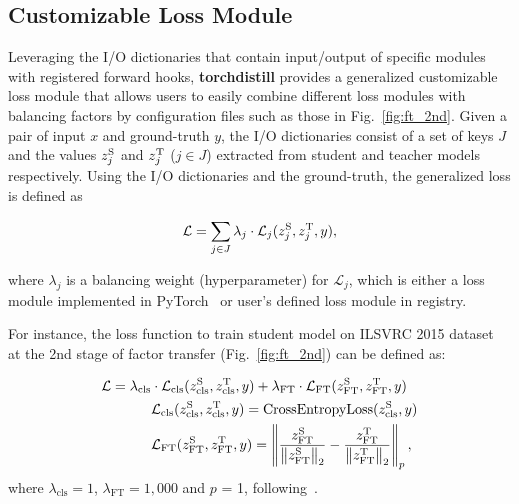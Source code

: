 \documentclass[runningheads]{llncs}
\newcommand\norm[1]{\left\lVert#1\right\rVert}
\newcommand{\FRAMEWORK}{{\bf torchdistill}\xspace}
\begin{document}
\subsection{Customizable Loss Module}
\label{subsec:custom_loss_module}
Leveraging the I/O dictionaries that contain input/output of specific modules with registered forward hooks, \FRAMEWORK provides a generalized customizable loss module that allows users to easily combine different loss modules with balancing factors by configuration files such as those in Fig.~\ref{fig:ft_2nd}.
Given a pair of input $x$ and ground-truth $y$, the I/O dictionaries consist of a set of keys $J$ and the values $z_{j}^{\textrm S}$ and $z_{j}^{\textrm T}$ ($j \in J$) extracted from student and teacher models respectively.
Using the I/O dictionaries and the ground-truth, the generalized loss is defined as

\begin{equation}
    \mathcal{L} = \sum_{j \in J} \lambda_{j} \cdot \mathcal{L}_{j}(z_{j}^{\textrm S}, z_{j}^{\textrm T}, y),
    \label{eq:custom_loss}
\end{equation}

\noindent where $\lambda_{j}$ is a balancing weight (hyperparameter) for $\mathcal{L}_{j}$, which is either a loss module implemented in PyTorch~\cite{paszke2019pytorch} or user's defined loss module in registry.

For instance, the loss function to train student model on ILSVRC 2015 dataset~\cite{russakovsky2015imagenet} at the 2nd stage of factor transfer (Fig.~\ref{fig:ft_2nd}) can be defined as:

\begin{align}
    \mathcal{L} = \lambda_{\textrm{cls}} &\cdot \mathcal{L}_{\textrm{cls}}(z_{\textrm{cls}}^{\textrm S}, z_{\textrm{cls}}^{\textrm T}, y) + \lambda_{\textrm{FT}} \cdot \mathcal{L}_{\textrm{FT}}(z_{\textrm{FT}}^{\textrm S}, z_{\textrm{FT}}^{\textrm T}, y)\\
    \nonumber
    &\mathcal{L}_{\textrm{cls}}(z_{\textrm{cls}}^{\textrm S}, z_{\textrm{cls}}^{\textrm T}, y) = \textrm{CrossEntropyLoss}(z_{\textrm{cls}}^{\textrm S}, y) \\ \nonumber
    &\mathcal{L}_{\textrm{FT}}(z_{\textrm{FT}}^{\textrm S}, z_{\textrm{FT}}^{\textrm T}, y) = \norm{\frac{z_{\textrm{FT}}^{\textrm S}}{\norm{z_{\textrm{FT}}^{\textrm S}}_{2}} - \frac{z_{\textrm{FT}}^{\textrm T}}{\norm{z_{\textrm{FT}}^{\textrm T}}_{2}}}_{p},
\end{align}
\noindent where $\lambda_{\textrm{cls}} = 1$, $\lambda_{\textrm{FT}} = 1,000$ and $p$ = 1, following~\cite{kim2018paraphrasing}.
\end{document}
